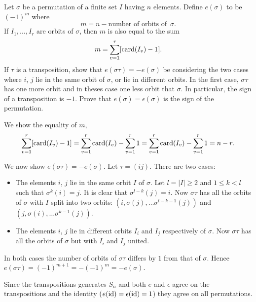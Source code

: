 \documentclass[12pt]{book}
\def\card{\mathop{\rm card}\nolimits}
\def\id{\mathop{\rm id}\nolimits}
\newcounter{myenumi}
\newenvironment{myenumerate}
{\begin{enumerate}
 \setcounter{enumi}{\themyenumi}
}
{\setcounter{myenumi}{\theenumi}
 \end{enumerate}}
\begin{document}
\begin{myenumerate}
\begin{excopy}
Let \(\sigma\) be a permutation of a finite set $I$ having $n$ elements.
Define \(e(\sigma)\) to be \((-1)^m\) where
\[m = n - \textrm{number of orbits of }\, \sigma.\]
If \(I_1,\ldots,I_r\) are orbits of \(\sigma\), then $m$ is also equal
to the sum
\[ m= \sum_{v=1}^r [\card(I_v)-1].\]
If \(\tau\)  is a transposition, show that \(e(\sigma\tau) = -e(\sigma)\)
be considering the two cases where $i$, $j$ lie in the same orbit of \(\sigma\),
or lie in different orbits. In the first case, \(\sigma\tau\) has one more
orbit and in theses case one less orbit that \(\sigma\).
In particular, the sign of a transposition is \(-1\).
Prove that \(e(\sigma)=\epsilon(\sigma)\) is the sign of the permutation.
\end{excopy}

We show the equality of $m$,
\[ \sum_{v=1}^r [\card(I_v)-1] =
   \sum_{v=1}^r \card(I_v) - \sum_{v=1}^r 1 =
   \sum_{v=1}^r \card(I_v) - \sum_{v=1}^r 1 =
   n - r.\]

We now show \(e(\sigma\tau)= -e(\sigma)\). Let \(\tau=(ij)\).
There are two cases:
\begin{itemize}
 \item
   The elements $i$, $j$  lie in the same orbit $I$ of \(\sigma\).
   Let \(l=|I|\geq 2\) and \(1\leq k<l\) such that \(\sigma^k(i)=j\).
   It is clear that \(\sigma^{l-k}(j)=i\).
   Now \(\sigma\tau\) has all the orbits of \(\sigma\)
   with $I$ split into two orbits:
     \((i, \sigma(j), \ldots \sigma^{l-k-1}(j))\)
   and
     \((j, \sigma(i), \ldots \sigma^{k-1}(j))\).
 \item
   The elements $i$, $j$  lie in different orbits \(I_i\) and \(I_j\)
   respectively of \(\sigma\).
   Now \(\sigma\tau\) has all the orbits of \(\sigma\)
   but with \(I_i\) and \(I_j\) united.
\end{itemize}
In both cases the number of orbits of \(\sigma\tau\) differs by $1$
from that of \(\sigma\).
Hence
\(e(\sigma\tau) = (-1)^{m+1} = -(-1)^m = -e(\sigma)\).

Since the transpositions  generates \(S_n\) and both $e$ and \(\epsilon\)
agree on the transpositions and the identity (\(e(\id)=\epsilon(\id)=1\))
they agree on all permutations.


\end{myenumerate}
\end{document}
